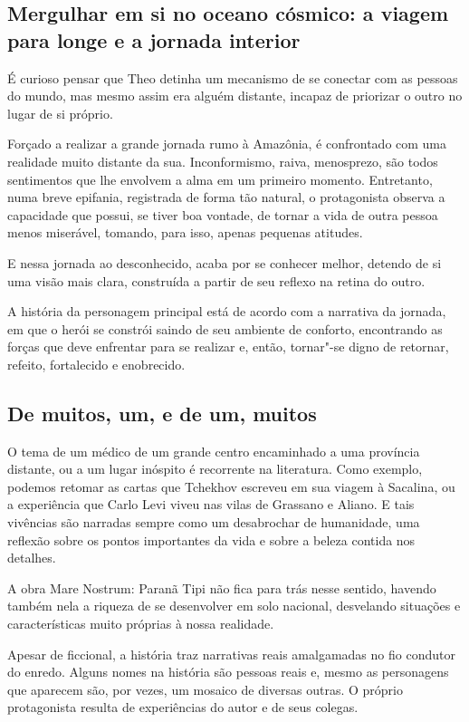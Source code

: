 \documentclass[12pt]{extarticle}
\begin{document}
\subsection{Mergulhar em si no oceano cósmico: a viagem para longe e a
jornada interior}

É curioso pensar que Theo detinha um mecanismo de se conectar com as
pessoas do mundo, mas mesmo assim era alguém distante, incapaz de
priorizar o outro no lugar de si próprio.

Forçado a realizar a grande jornada rumo à Amazônia, é confrontado com
uma realidade muito distante da sua. Inconformismo, raiva, menosprezo,
são todos sentimentos que lhe envolvem a alma em um primeiro momento.
Entretanto, numa breve epifania, registrada de forma tão natural, o
protagonista observa a capacidade que possui, se tiver boa vontade, de
tornar a vida de outra pessoa menos miserável, tomando, para isso,
apenas pequenas atitudes.

E nessa jornada ao desconhecido, acaba por se conhecer melhor, detendo
de si uma visão mais clara, construída a partir de seu reflexo na retina
do outro.

A história da personagem principal está de acordo com a narrativa da
jornada, em que o herói se constrói saindo de seu ambiente de conforto,
encontrando as forças que deve enfrentar para se realizar e, então,
tornar"-se digno de retornar, refeito, fortalecido e enobrecido.

\subsection{De muitos, um, e de um, muitos}

O tema de um médico de um grande centro encaminhado a uma província
distante, ou a um lugar inóspito é recorrente na literatura. Como
exemplo, podemos retomar as cartas que Tchekhov escreveu em sua viagem à
Sacalina, ou a experiência que Carlo Levi viveu nas vilas de Grassano e
Aliano. E tais vivências são narradas sempre como um desabrochar de
humanidade, uma reflexão sobre os pontos importantes da vida e sobre a
beleza contida nos detalhes.

A obra Mare Nostrum: Paranã Tipi não fica para trás nesse sentido,
havendo também nela a riqueza de se desenvolver em solo nacional,
desvelando situações e características muito próprias à nossa realidade.

Apesar de ficcional, a história traz narrativas reais amalgamadas no fio
condutor do enredo. Alguns nomes na história são pessoas reais e, mesmo
as personagens que aparecem são, por vezes, um mosaico de diversas
outras. O próprio protagonista resulta de experiências do autor e de
seus colegas.
\end{document}
